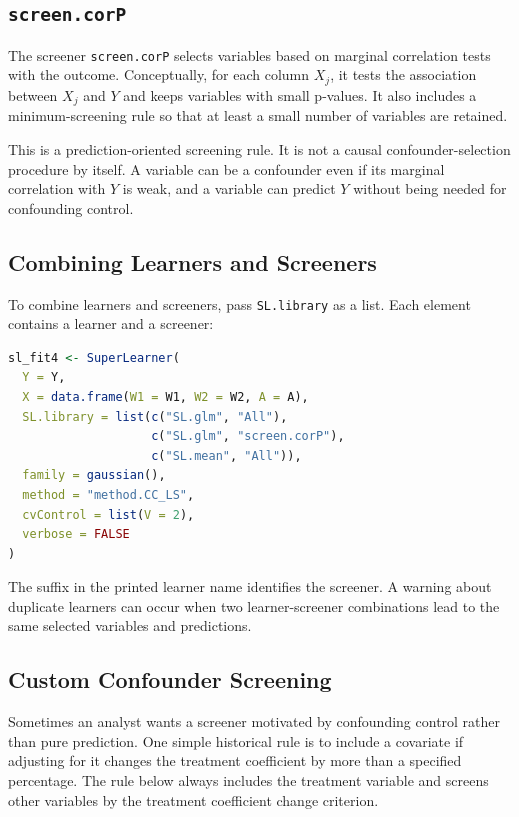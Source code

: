 \subsection{\texttt{screen.corP}}

The screener \texttt{screen.corP} selects variables based on marginal correlation tests
with the outcome. Conceptually, for each column $X_j$, it tests the association
between $X_j$ and $Y$ and keeps variables with small p-values. It also includes a
minimum-screening rule so that at least a small number of variables are retained.

This is a prediction-oriented screening rule. It is not a causal confounder-selection
procedure by itself. A variable can be a confounder even if its marginal correlation
with $Y$ is weak, and a variable can predict $Y$ without being needed for confounding
control.

\subsection{Combining Learners and Screeners}

To combine learners and screeners, pass \texttt{SL.library} as a list. Each element
contains a learner and a screener:

\begin{implementationbox}
\begin{lstlisting}[language=R]
sl_fit4 <- SuperLearner(
  Y = Y,
  X = data.frame(W1 = W1, W2 = W2, A = A),
  SL.library = list(c("SL.glm", "All"),
                    c("SL.glm", "screen.corP"),
                    c("SL.mean", "All")),
  family = gaussian(),
  method = "method.CC_LS",
  cvControl = list(V = 2),
  verbose = FALSE
)
\end{lstlisting}
\end{implementationbox}

The suffix in the printed learner name identifies the screener. A warning about
duplicate learners can occur when two learner-screener combinations lead to the same
selected variables and predictions.

\subsection{Custom Confounder Screening}

Sometimes an analyst wants a screener motivated by confounding control rather than
pure prediction. One simple historical rule is to include a covariate if adjusting for it
changes the treatment coefficient by more than a specified percentage. The rule below
always includes the treatment variable and screens other variables by the treatment
coefficient change criterion.

